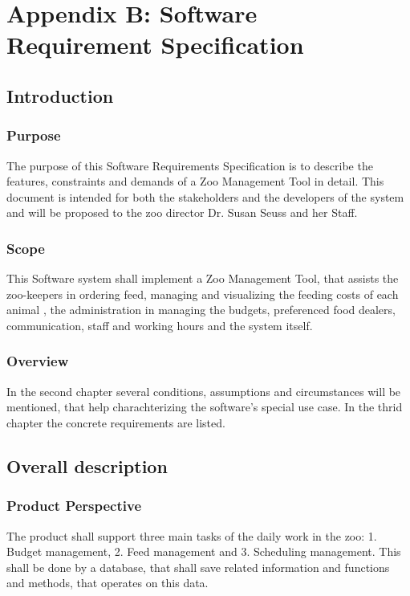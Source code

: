 \section{Appendix B: Software Requirement Specification}

\subsection{Introduction}
	\subsubsection{Purpose}
			The purpose of this Software Requirements Specification is to describe the features, constraints and demands of a Zoo Management Tool in detail. This document is intended for both the stakeholders and the developers of the system and will be proposed to the zoo director Dr. Susan Seuss and her Staff.
			
	\subsubsection{Scope}
			This Software system shall implement a Zoo Management Tool, that assists the zoo-keepers in ordering feed, managing and visualizing the feeding costs of each animal , the administration in managing the budgets, preferenced food dealers, communication, staff and working hours and the system itself.

	\subsubsection{Overview}
		In the second chapter several conditions, assumptions and circumstances will be mentioned, that help charachterizing the software's special use case. In the thrid chapter the concrete requirements are listed.
		\newpage
		
\subsection{Overall description}
	\subsubsection{Product Perspective}
		The product shall support three main tasks of the daily work in the zoo: 1. Budget management, 2. Feed management and 3. Scheduling management. This shall be done by a database, that shall save related information and functions and methods, that operates on this data.

